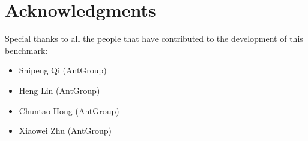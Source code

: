 \chapter*{Acknowledgments}
Special thanks to all the people that have contributed to the development of this benchmark:
\begin{itemize}
  \item Shipeng Qi (AntGroup)
  \item Heng Lin (AntGroup)
  \item Chuntao Hong (AntGroup)
  \item Xiaowei Zhu (AntGroup)
\end{itemize}
